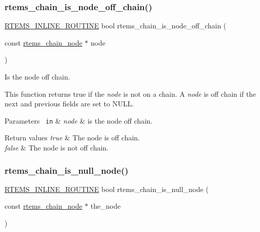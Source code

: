 \subsubsection{\texorpdfstring{rtems\_chain\_is\_node\_off\_chain()}{rtems\_chain\_is\_node\_off\_chain()}}
{\footnotesize\ttfamily \mbox{\hyperlink{group__RTEMSScoreBaseDefs_gac216239df231d5dbd15e3520b0b9313f}{R\+T\+E\+M\+S\+\_\+\+I\+N\+L\+I\+N\+E\+\_\+\+R\+O\+U\+T\+I\+NE}} bool rtems\+\_\+chain\+\_\+is\+\_\+node\+\_\+off\+\_\+chain (\begin{DoxyParamCaption}\item[{const \mbox{\hyperlink{structChain__Node__struct}{rtems\+\_\+chain\+\_\+node}} $\ast$}]{node }\end{DoxyParamCaption})}



Is the node off chain. 

This function returns true if the {\itshape node} is not on a chain. A {\itshape node} is off chain if the next and previous fields are set to N\+U\+LL.


\begin{DoxyParams}[1]{Parameters}
\mbox{\texttt{ in}}  & {\em node} & is the node off chain.\\
\hline
\end{DoxyParams}

\begin{DoxyRetVals}{Return values}
{\em true} & The node is off chain. \\
\hline
{\em false} & The node is not off chain. \\
\hline
\end{DoxyRetVals}
\mbox{\label{group__ClassicChains_ga55175f3e42d62a6b7214f3d830f07d0a}} 
\subsubsection{\texorpdfstring{rtems\_chain\_is\_null\_node()}{rtems\_chain\_is\_null\_node()}}
{\footnotesize\ttfamily \mbox{\hyperlink{group__RTEMSScoreBaseDefs_gac216239df231d5dbd15e3520b0b9313f}{R\+T\+E\+M\+S\+\_\+\+I\+N\+L\+I\+N\+E\+\_\+\+R\+O\+U\+T\+I\+NE}} bool rtems\+\_\+chain\+\_\+is\+\_\+null\+\_\+node (\begin{DoxyParamCaption}\item[{const \mbox{\hyperlink{structChain__Node__struct}{rtems\+\_\+chain\+\_\+node}} $\ast$}]{the\+\_\+node }\end{DoxyParamCaption})}



